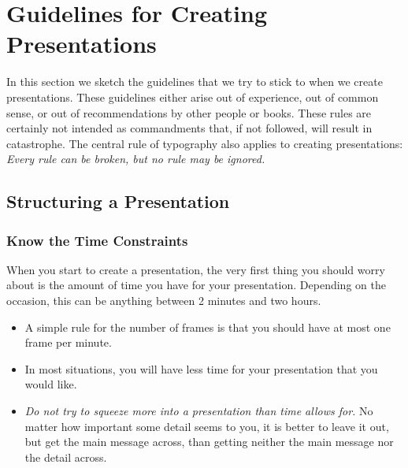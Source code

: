 %
%
%


\section{Guidelines for Creating Presentations}
\label{section-guidelines}

In this section we sketch the guidelines that we try to stick to when we create presentations. These guidelines either arise out of experience, out of common sense, or out of recommendations by other people or books. These rules are certainly not intended as commandments that, if not followed, will result in catastrophe. The central rule of typography also applies to creating presentations: \emph{Every rule can be broken, but no rule may be ignored.}


\subsection{Structuring a Presentation}
\label{section-structure-guidelines}

\subsubsection{Know the Time Constraints}

When you start to create a presentation, the very first thing you should worry about is the amount of time you have for your presentation. Depending on the occasion, this can be anything between 2 minutes and two hours.
\begin{itemize}
\item
  A simple rule for the number of frames is that you should have at most one frame per minute.
\item
  In most situations, you will have less time for your presentation that you would like.
\item
  \emph{Do not try to squeeze more into a presentation than time allows for.} No matter how important some detail seems to you, it is better to leave it out, but get the main message across, than getting neither the main message nor the detail across.
\end{itemize}

